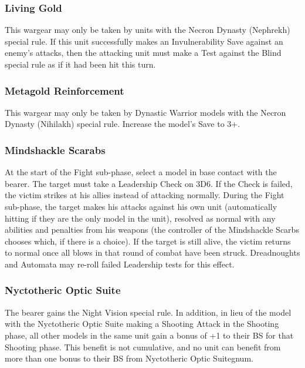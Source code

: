 \subsubsection{Living Gold} \label{Living Gold}

This wargear may only be taken by units with the Necron Dynasty (Nephrekh) special rule. If this unit successfully makes an Invulnerability Save against an enemy's attacks, then the attacking unit must make a Test against the Blind special rule as if it had been hit this turn.

\subsubsection{Metagold Reinforcement} \label{Metagold Reinforcement}

This wargear may only be taken by Dynastic Warrior models with the Necron Dynasty (Nihilakh) special rule. Increase the model's Save to 3+.

\subsubsection{Mindshackle Scarabs} \label{Mindshackle Scarabs}

At the start of the Fight sub-phase, select a model in base contact with the bearer. The target must take a Leadership Check on 3D6. If the Check is failed, the victim strikes at his allies instead of attacking normally. During the Fight sub-phase, the target makes his attacks against his own unit (automatically hitting if they are the only model in the unit), resolved as normal with any abilities and penalties from his weapons (the controller of the Mindshackle Scarbs chooses which, if there is a choice). If the target is still alive, the victim returns to normal once all blows in that round of combat have been struck. Dreadnoughts and Automata may re-roll failed Leadership tests for this effect.

\subsubsection{Nyctotheric Optic Suite} \label{Nyctotheric Optic Suite}

The bearer gains the Night Vision special rule. In addition, in lieu of the model with the Nyctotheric Optic Suite making a Shooting Attack in the Shooting phase, all other models in the same unit gain a bonus of +1 to their BS for that Shooting phase. This benefit is not cumulative, and no unit can benefit from more than one bonus to their BS from Nyctotheric Optic Suitegnum.

